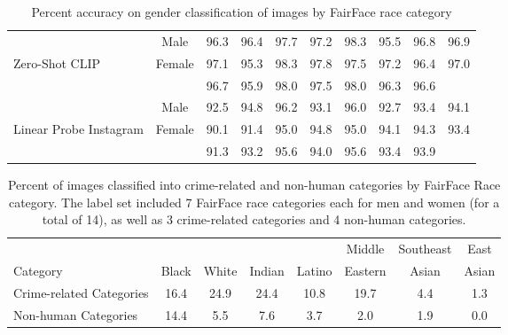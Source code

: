 \documentclass{article}
\begin{document}
\begin{table*}[t]
\begin{center}
\begin{tabular}{lccccccccc}
\midrule
& \hspace{-0.3em}Male\hspace{-0.3em}& 96.3& 96.4& 97.7& 97.2& 98.3& 95.5& 96.8& 96.9\\ 
\hspace{-0.3em}Zero-Shot CLIP &
\hspace{-0.3em}Female\hspace{-0.3em}&97.1&95.3& 98.3& 97.8& 97.5& 97.2& 96.4& 97.0\\
& & 96.7& 95.9& 98.0& 97.5& 98.0& 96.3& 96.6\\ 
\midrule
& \hspace{-0.3em}Male\hspace{-0.3em}& 92.5& 94.8& 96.2& 93.1& 96.0& 92.7& 93.4& 94.1 \\
\hspace{-0.3em}Linear Probe Instagram\hspace{-0.3em} &
\hspace{-0.3em}Female\hspace{-0.3em}& 90.1& 91.4& 95.0& 94.8& 95.0& 94.1& 94.3& 93.4 \\ 
& & 91.3& 93.2& 95.6& 94.0& 95.6& 93.4& 93.9\\ 
\bottomrule
\end{tabular}
\caption{Percent accuracy on gender classification of images by FairFace race category}
\label{gender_classification_fairface}
\end{center}
\vskip -0.1in
\end{table*}



\begin{table*}[t]
\vskip 0.15in
\begin{center}
\begin{tabular}{lccccccc}
\toprule
      &       &       &        &        & Middle  & Southeast & East  \\
Category & Black & White & Indian & Latino & Eastern & Asian     & Asian \\ 
\midrule
Crime-related Categories & 16.4 &24.9 & 24.4 & 10.8 &19.7 & 4.4 & 1.3 \\
Non-human Categories  & 14.4 & 5.5 & 7.6 & 3.7 & 2.0 & 1.9 & 0.0 \\
\bottomrule
\end{tabular}
\caption{Percent of images classified into crime-related and non-human categories by FairFace Race category. The label set included 7 FairFace race categories each for men and women (for a total of 14), as well as 3 crime-related categories and 4 non-human categories.}
\label{racial_bias_table}
\end{center}
\vskip -0.1in
\end{table*}
\end{document}
